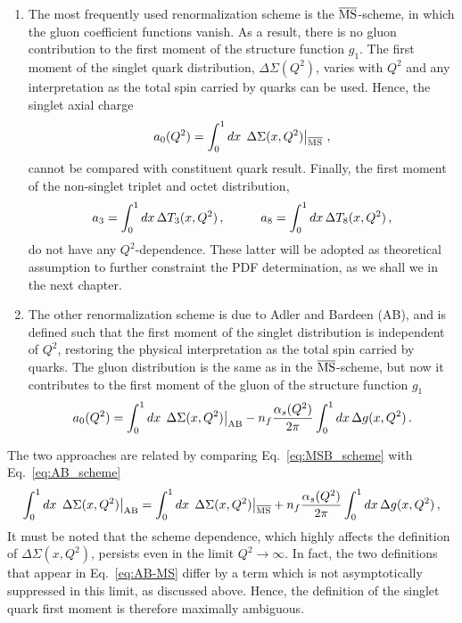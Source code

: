\begin{enumerate}
  \item The most frequently used renormalization scheme is the $\overline{\textrm{MS}}$-scheme, in which the gluon coefficient functions vanish. As a result, there is no gluon contribution to the first moment of the structure function $g_1$. The first moment of the singlet quark distribution, $\Delta \Sigma (Q^2)$, varies with $Q^2$ and any interpretation as the total spin carried by quarks can be used. Hence, the singlet axial charge 
  \begin{equation}
    a_0 (Q^2) = \int_{0}^{1} dx \,  \left.\Delta \Sigma(x,Q^2) \right|_{\overline{\textrm{MS}}} \,,
    \label{eq:MSB_scheme}
  \end{equation}
  cannot be compared with constituent quark result. Finally, the first moment of the non-singlet triplet and octet distribution,
  \begin{equation}
    a_3 = \int_{0}^{1} dx \, \Delta T_3 (x,Q^2) \,, \hspace{10mm} a_8 = \int_{0}^{1} dx \, \Delta T_8 (x,Q^2) \,,
  \end{equation}
  do not have any $Q^2$-dependence. These latter will be adopted as theoretical assumption to further constraint the PDF determination, as we shall we in the next chapter.
  
  \item The other renormalization scheme is due to Adler and Bardeen (AB), and is defined such that the first moment of the singlet distribution is independent of $Q^2$, restoring the physical interpretation as the total spin carried by quarks. The gluon distribution is the same as in the $\overline{\textrm{MS}}$-scheme, but now it contributes to the first moment of the gluon of the structure function $g_1$
  \begin{equation}
    a_{0}(Q^2) = \int_{0}^{1} dx \, \left. \Delta \Sigma (x,Q^2) \right|_{\textrm{AB}} - n_f \frac{\alpha_s(Q^2)}{2\pi} \int_{0}^{1} dx \, \Delta g(x,Q^2) \,.
    \label{eq:AB_scheme}
  \end{equation}
\end{enumerate}
The two approaches are related by comparing Eq.~\eqref{eq:MSB_scheme} with Eq.~\eqref{eq:AB_scheme}
\begin{equation}
  \int_{0}^{1} dx \, \left. \Delta \Sigma (x,Q^2) \right|_{\textrm{AB}} = \int_{0}^{1} dx \, \left. \Delta \Sigma (x,Q^2) \right|_{\overline{\textrm{MS}}} + n_f \frac{\alpha_s(Q^2)}{2\pi}  \int_0^1 dx \, \Delta g(x,Q^2)\,,
  \label{eq:AB-MS}
\end{equation}
It must be noted that the scheme dependence, which highly affects the definition of $\Delta \Sigma (x,Q^2)$, persists even in the limit $Q^2 \rightarrow \infty$. In fact, the two definitions that appear in Eq.~\eqref{eq:AB-MS} differ by a term which is not asymptotically suppressed in this limit, as discussed above. Hence, the definition of the singlet quark first moment is therefore maximally ambiguous.

